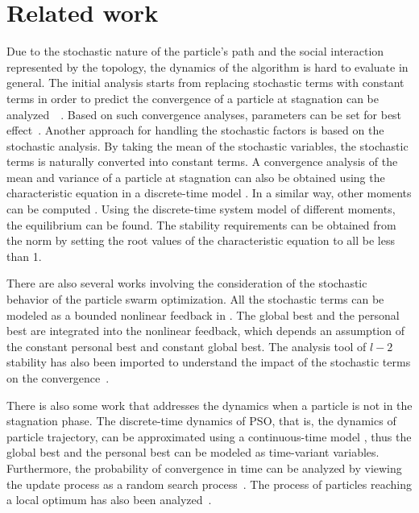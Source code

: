 \section{Related work}
\label{sec:rel_work}

Due to the stochastic nature of the particle's path and the social interaction represented by the topology, the dynamics of the algorithm is hard to evaluate in general.
The initial analysis starts from replacing stochastic terms with constant terms in order to predict the convergence of a particle at stagnation can be analyzed~\cite{985692}~\cite{4424687}.
Based on such convergence analyses, parameters can be set for best effect~\cite{Trelea2003317}.
Another approach for handling the stochastic factors is based on the stochastic analysis.
By taking the mean of the stochastic variables, the stochastic terms is naturally converted into
constant terms.
A convergence analysis of the mean and variance of a particle at stagnation can also be obtained using the characteristic equation in a discrete-time model 
\cite{Jiang20078}.
In a similar way, 
other moments can be computed
\cite{5175367,Poli:2007:EAS:1276958.1276977,Poli:2008:DSS:1384929.1384944}.
Using the discrete-time system model of different moments, the equilibrium can be found.
The stability requirements can be obtained from the norm by setting the root values of the characteristic equation to all be less than 1.

There are also several works involving the consideration of the stochastic behavior of the particle swarm optimization.
All the stochastic terms can be modeled as a bounded nonlinear feedback in \cite{1637686}.
The global best and the personal best are integrated into the nonlinear feedback, which depends an assumption of the constant personal best and constant global best.
The analysis tool of $ l-2 $ stability has also been imported to understand the impact of the stochastic terms on the convergence~\cite{5160341}.

There is also some work that addresses the dynamics when a particle is not in the stagnation phase.
The discrete-time dynamics of PSO, that is, the dynamics of particle trajectory, can be approximated
using a continuous-time model
\cite{5675669}, thus the global best and the personal best can be modeled as time-variant variables.
Furthermore, the probability of convergence in time can be analyzed by viewing the update process as a random search process~\cite{vandenBergh:2010:CPP:2010420.2010421}.
The process of particles reaching a local optimum has also been analyzed~\cite{Schmitt:2013:PSO:2463372.2463563}.

